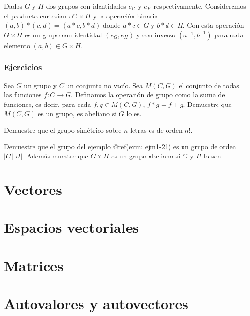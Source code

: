 \documentclass[12pt,]{krantz}
\theoremstyle{definition}
\theoremstyle{definition}
\theoremstyle{definition}
\theoremstyle{remark}
\let\BeginKnitrBlock\begin \let\EndKnitrBlock\end
\begin{document}
\BeginKnitrBlock{example}
\protect\hypertarget{exm:ejm1-21}{}{\label{exm:ejm1-21} }Dados \(G\) y \(H\)
dos grupos con identidades \(e_{G}\) y \(e_{H}\) respectivamente.
Consideremos el producto cartesiano \(G\times H\) y la operación binaria
\((a,b)\ast (c,d)=(a\ast c,b\ast d)\) donde \(a\ast c\in G\) y
\(b\ast d\in H\). Con esta operación \(G\times H\) es un grupo con
identidad \((e_{G}, e_{H})\) y con inverso \((a^{-1}, b^{-1})\) para
cada elemento \((a,b)\in G\times H\).
\EndKnitrBlock{example}

\subsection{Ejercicios}\label{ejercicios-1}

\BeginKnitrBlock{exercise}
\protect\hypertarget{exr:unnamed-chunk-55}{}{\label{exr:unnamed-chunk-55}
}Sea \(G\) un grupo y \(C\) un conjunto no vacío. Sea \(M(C,G)\) el
conjunto de todas las funciones \(f:C\longrightarrow G\). Definamos la
operación de grupo como la suma de funciones, es decir, para cada
\(f,g\in M(C,G)\), \(f\ast g = f +g\). Demuestre que \(M(C,G)\) es un
grupo, es abeliano si \(G\) lo es.
\EndKnitrBlock{exercise}

\BeginKnitrBlock{exercise}
\protect\hypertarget{exr:ejc3}{}{\label{exr:ejc3} }Demuestre que el grupo
simétrico sobre \(n\) letras es de orden \(n!\).
\EndKnitrBlock{exercise}

\BeginKnitrBlock{exercise}
\protect\hypertarget{exr:unnamed-chunk-56}{}{\label{exr:unnamed-chunk-56}
}Demuestre que el grupo del ejemplo @ref(exm: ejm1-21) es un grupo de
orden \(|G||H|\). Además muestre que \(G\times H\) es un grupo abeliano
si \(G\) y \(H\) lo son.
\EndKnitrBlock{exercise}

\chapter{Vectores}\label{vectores}

\chapter{Espacios vectoriales}\label{espacios-vectoriales}

\chapter{Matrices}\label{matrices}

\chapter{Autovalores y autovectores}\label{autovalores-y-autovectores}
\end{document}
